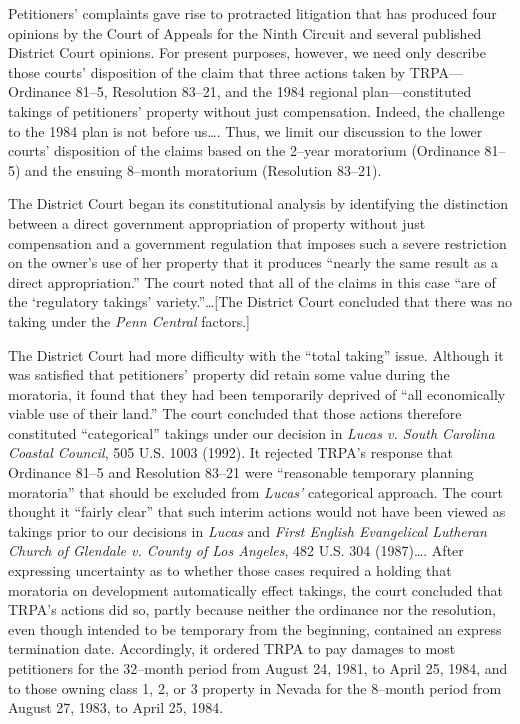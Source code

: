 Petitioners' complaints gave rise to protracted litigation that has produced
four opinions by the Court of Appeals for the Ninth Circuit and several
published District Court opinions. For present purposes, however, we need only
describe those courts' disposition of the claim that three actions taken by
TRPA---Ordinance 81--5, Resolution 83--21, and the 1984 regional
plan---constituted takings of petitioners' property without just compensation.
Indeed, the challenge to the 1984 plan is not before us\ldots. Thus, we limit
our discussion to the lower courts' disposition of the claims based on the
2--year moratorium (Ordinance 81--5) and the ensuing 8--month moratorium
(Resolution 83--21).

The District Court began its constitutional analysis by identifying the
distinction between a direct government appropriation of property without just
compensation and a government regulation that imposes such a severe restriction
on the owner's use of her property that it produces ``nearly the same result as
a direct appropriation.'' The court noted that all of the claims in this case
``are of the `regulatory takings' variety.''\ldots [The District Court concluded
that there was no taking under the \textit{Penn Central} factors.]

The District Court had more difficulty with the ``total taking'' issue. Although
it was satisfied that petitioners' property did retain some value during the
moratoria, it found that they had been temporarily deprived of ``all
economically viable use of their land.'' The court concluded that those actions
therefore constituted ``categorical'' takings under our decision in
\textit{Lucas v. South Carolina Coastal Council}, 505 U.S. 1003 (1992). It
rejected TRPA's response that Ordinance 81--5 and Resolution 83--21 were
``reasonable temporary planning moratoria'' that should be excluded from
\textit{Lucas'} categorical approach. The court thought it ``fairly clear'' that
such interim actions would not have been viewed as takings prior to our
decisions in \textit{Lucas} and \textit{First English Evangelical Lutheran
Church of Glendale v. County of Los Angeles}, 482 U.S. 304 (1987)\ldots . After
expressing uncertainty as to whether those cases required a holding that
moratoria on development automatically effect takings, the court concluded that
TRPA's actions did so, partly because neither the ordinance nor the resolution,
even though intended to be temporary from the beginning, contained an express
termination date. Accordingly, it ordered TRPA to pay damages to most
petitioners for the 32--month period from August 24, 1981, to April 25, 1984,
and to those owning class 1, 2, or 3 property in Nevada for the 8--month period
from August 27, 1983, to April 25, 1984.

